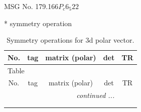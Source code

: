 \documentclass[fleqn,8pt]{jsarticle}
\begin{document}
\setcounter{MaxMatrixCols}{32}

\renewcommand{\tablename}{Table~}
\renewcommand{\figurename}{Figure~}
\begin{center}
\LARGE
MSG No. 179.166\quad$P_{c}6_{5}22$
\end{center}
* symmetry operation
\renewcommand{\arraystretch}{1.3}
\begin{longtable}{ccccc}
\caption{Symmetry operations for 3d polar vector.}
 \\
 \hline \hline
No. & tag & matrix (polar) & det & TR \\ \hline \endfirsthead

\multicolumn{4}{l}{\tablename\ \thetable{}} \\
 \hline \hline
No. & tag & matrix (polar) & det & TR \\ \hline \endhead

 \hline \hline
\multicolumn{4}{r}{\footnotesize\it continued ...} \\ \endfoot

 \hline \hline
\multicolumn{4}{r}{} \\ \endlastfoot


\end{longtable}
\end{document}

